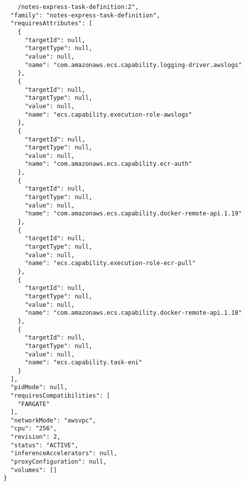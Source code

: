 \begin{verbatim}
    /notes-express-task-definition:2",
  "family": "notes-express-task-definition",
  "requiresAttributes": [
    {
      "targetId": null,
      "targetType": null,
      "value": null,
      "name": "com.amazonaws.ecs.capability.logging-driver.awslogs"
    },
    {
      "targetId": null,
      "targetType": null,
      "value": null,
      "name": "ecs.capability.execution-role-awslogs"
    },
    {
      "targetId": null,
      "targetType": null,
      "value": null,
      "name": "com.amazonaws.ecs.capability.ecr-auth"
    },
    {
      "targetId": null,
      "targetType": null,
      "value": null,
      "name": "com.amazonaws.ecs.capability.docker-remote-api.1.19"
    },
    {
      "targetId": null,
      "targetType": null,
      "value": null,
      "name": "ecs.capability.execution-role-ecr-pull"
    },
    {
      "targetId": null,
      "targetType": null,
      "value": null,
      "name": "com.amazonaws.ecs.capability.docker-remote-api.1.18"
    },
    {
      "targetId": null,
      "targetType": null,
      "value": null,
      "name": "ecs.capability.task-eni"
    }
  ],
  "pidMode": null,
  "requiresCompatibilities": [
    "FARGATE"
  ],
  "networkMode": "awsvpc",
  "cpu": "256",
  "revision": 2,
  "status": "ACTIVE",
  "inferenceAccelerators": null,
  "proxyConfiguration": null,
  "volumes": []
}
\end{verbatim}

